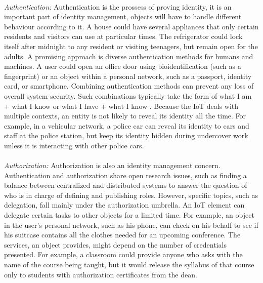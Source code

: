 \documentclass[10pt, twocolumn]{article}
\begin{document}
\paragraph{}
\emph{Authentication: }Authentication is the prossess of proving identity,  it is an important part of identity management, objects will have to handle different behaviour according to it. A house could have several appliances that only certain residents and visitors can use at particular times. The refrigerator could lock  itself after midnight to any resident or visiting teenagers, but remain open for the adults. A promising approach is diverse authentication methods for humans and machines. A user could open an office door using bioidentification (such as a fingerprint) or an object  within a personal network, such as a passport, identity card, or smartphone. Combining authentication  methods can prevent any loss of overall system security. Such combinations typically take the form of what I am + what I know or what I have + what I know \cite{ref11}.
Because the IoT deals with multiple contexts, an entity is not likely to reveal its identity all the time. For example, in a vehicular network, a police car can reveal its identity to cars and staff at the police station, but keep its identity hidden during undercover work unless it is interacting with other police cars.  
 \paragraph{}
\emph{Authorization: }Authorization is also an identity management concern. Authentication and authorization share open  research issues, such as finding a balance between centralized and distributed systems to answer the question of who is in charge of defining and publishing roles. However, specific topics, such as delegation, fall mainly under the authorization umbrella. An IoT element can delegate certain tasks to other objects for a limited time. For example, an object in the user’s personal network, such as his phone, can check on his behalf to see if his suitcase contains all the clothes needed for an upcoming conference. The services, an object provides, might depend on the number of credentials presented. For example, a classroom could provide anyone who asks with the name of the course being taught, but it would release the syllabus of that course only to students with authorization certificates from the dean.
\end{document}

